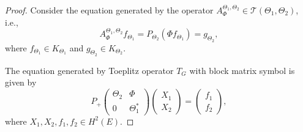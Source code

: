\documentclass[10pt,a4paper]{amsart}
\begin{document}
\begin{proof}
Consider the equation generated by the operator $A_{\Phi}^{\Theta_{1},\Theta_{2}}\in \mathcal{T}(\Theta_{1},\Theta_{2})$, i.e.,
\begin{equation}\label{asymm}
A_{\Phi}^{\Theta_{1},\Theta_{2}}f_{\Theta_{1}}=P_{\Theta_{2}}(\Phi f_{\Theta_{1}})=g_{\Theta_{2}},
\end{equation}
where $f_{\Theta_{1}}\in K_{\Theta_{1}}$ and $g_{\Theta_{2}}\in K_{\Theta_{2}}$.
\medskip

The equation generated by Toeplitz operator $T_{G}$ with block matrix symbol is given by
 \begin{equation}\label{TG}
P_{+}\begin{pmatrix}
\Theta_{2}& \Phi\\
0&\Theta_{1}^{*}
\end{pmatrix}
\begin{pmatrix}
X_{1}\\
X_{2}
\end{pmatrix}
=\begin{pmatrix}
f_{1}\\
f_{2}
\end{pmatrix},
\end{equation}
where $X_{1}, X_{2}, f_{1}, f_{2}\in H^{2}(E)$.


\end{proof}
\end{document}
